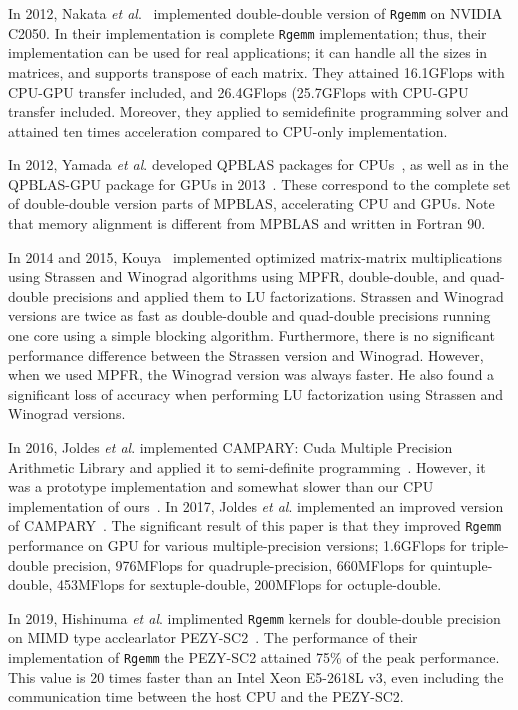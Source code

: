 \documentclass[12pt]{article}
\newcommand{\etal}{\textit{et al}.}
\begin{document}
In 2012, Nakata \etal{}~\cite{6495966} implemented double-double version of {\tt Rgemm} on NVIDIA C2050. In their implementation is complete {\tt Rgemm} implementation; thus, their implementation can be used for real applications; it can handle all the sizes in matrices, and supports transpose of each matrix. They attained 16.1GFlops with CPU-GPU transfer included, and 26.4GFlops (25.7GFlops with CPU-GPU transfer included. Moreover, they applied to semidefinite programming solver and attained ten times acceleration compared to CPU-only implementation.

In 2012, Yamada \etal{} developed QPBLAS packages for CPUs~\cite{7965202}, as well as in the QPBLAS-GPU package for GPUs in 2013~\cite{qpblas-gpu}. These correspond to the complete set of double-double version parts of MPBLAS, accelerating CPU and GPUs. Note that memory alignment is different from MPBLAS and written in Fortran 90.

In 2014 and 2015, Kouya~\cite{Tomonori_Kouya2014,Tomonori_Kouya2016} implemented optimized  matrix-matrix multiplications using Strassen and Winograd algorithms using MPFR, double-double, and quad-double precisions and applied them to LU factorizations. Strassen and Winograd versions are twice as fast as double-double and quad-double precisions running one core using a simple blocking algorithm. Furthermore, there is no significant performance difference between the Strassen version and Winograd. However, when we used MPFR, the Winograd version was always faster. He also found a significant loss of accuracy when performing LU factorization using Strassen and Winograd versions. 

In 2016, Joldes \etal{} implemented CAMPARY: Cuda Multiple Precision Arithmetic Library and applied it to semi-definite programming~\cite{10.1007/978-3-319-42432-3_29}. However, it was a prototype implementation and somewhat slower than our CPU implementation of ours~\cite{SDPA-GMP}. In 2017, Joldes \etal{} implemented an improved version of CAMPARY~\cite{8023060}. The significant result of this paper is that they improved {\tt Rgemm} performance on GPU for various multiple-precision versions; 1.6GFlops for triple-double precision, 976MFlops for quadruple-precision, 660MFlops for quintuple-double, 453MFlops for sextuple-double, 200MFlops for octuple-double.

In 2019, Hishinuma \etal{} implimented {\tt Rgemm} kernels for double-double precision on MIMD type acclearlator PEZY-SC2~\cite{hishinuma2019pzqd}. 
The performance of their implementation of {\tt Rgemm} the PEZY-SC2 attained 75\% of the peak performance. This value is 20 times faster than an Intel Xeon E5-2618L v3, even including the communication time between the host CPU and the PEZY-SC2.
\end{document}
